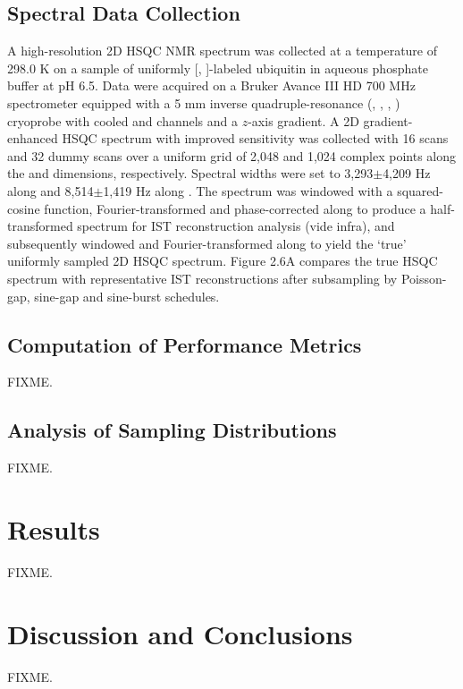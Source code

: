 \subsection{Spectral Data Collection}

\begin{doublespace}
A high-resolution 2D \hnnmr{} HSQC NMR spectrum was collected at a temperature
of 298.0 K on a sample of uniformly [\nnmr{}, \cnmr{}]-labeled ubiquitin in
aqueous phosphate buffer at pH 6.5. Data were acquired on a Bruker Avance
III HD 700 MHz spectrometer equipped with a 5 mm inverse quadruple-resonance
(\hnmr{}, \cnmr{}, \nnmr{}, \pnmr{}) cryoprobe with cooled \hnmr{} and \cnmr{}
channels and a $z$-axis gradient. A 2D gradient-enhanced \hnnmr{} HSQC spectrum
with improved sensitivity \cite{kay:jacs1992,palmer:jmr1991} was collected with
16 scans and 32 dummy scans over a uniform grid of 2,048 and 1,024 complex
points along the \hnmr{} and \nnmr{} dimensions, respectively. Spectral widths
were set to 3,293$\pm$4,209 Hz along \hnmr{} and 8,514$\pm$1,419 Hz along
\nnmr{}. The spectrum was windowed with a squared-cosine function,
Fourier-transformed and phase-corrected along \hnmr{} to produce a
half-transformed spectrum for IST reconstruction analysis (vide infra),
and subsequently windowed and Fourier-transformed along \nnmr{} to yield the
`true' uniformly sampled 2D \hnnmr{} HSQC spectrum. Figure 2.6A compares the
true HSQC spectrum with representative IST reconstructions after subsampling
by Poisson-gap, sine-gap and sine-burst schedules.
\end{doublespace}

\subsection{Computation of Performance Metrics}

\begin{doublespace}
FIXME.
\end{doublespace}

\subsection{Analysis of Sampling Distributions}

\begin{doublespace}
FIXME.
\end{doublespace}

\section{Results}

\begin{doublespace}
FIXME.
\end{doublespace}

\section{Discussion and Conclusions}

\begin{doublespace}
FIXME.
\end{doublespace}




